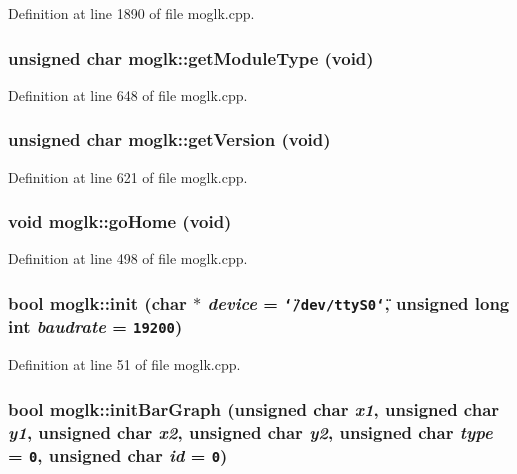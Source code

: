 Definition at line 1890 of file moglk.cpp.\hypertarget{classmoglk_9fffd2e63880a4ea0ecf8e1d9f196668}{
\subsubsection[{getModuleType}]{\setlength{\rightskip}{0pt plus 5cm}unsigned char moglk::getModuleType (void)}}
\label{classmoglk_9fffd2e63880a4ea0ecf8e1d9f196668}




Definition at line 648 of file moglk.cpp.\hypertarget{classmoglk_353d736b01087f171ceb14a7a01cd292}{
\subsubsection[{getVersion}]{\setlength{\rightskip}{0pt plus 5cm}unsigned char moglk::getVersion (void)}}
\label{classmoglk_353d736b01087f171ceb14a7a01cd292}




Definition at line 621 of file moglk.cpp.\hypertarget{classmoglk_1f33a99d62509dfd98ca6898ba5a228e}{
\subsubsection[{goHome}]{\setlength{\rightskip}{0pt plus 5cm}void moglk::goHome (void)}}
\label{classmoglk_1f33a99d62509dfd98ca6898ba5a228e}




Definition at line 498 of file moglk.cpp.\hypertarget{classmoglk_2b26bc8f68f3b4efcac9d1e6d902b695}{
\subsubsection[{init}]{\setlength{\rightskip}{0pt plus 5cm}bool moglk::init (char $\ast$ {\em device} = {\tt \char`\"{}/dev/ttyS0\char`\"{}}, \/  unsigned long int {\em baudrate} = {\tt 19200})}}
\label{classmoglk_2b26bc8f68f3b4efcac9d1e6d902b695}




Definition at line 51 of file moglk.cpp.\hypertarget{classmoglk_cf20f143dc45f7cffd9cde3de54ea8aa}{
\subsubsection[{initBarGraph}]{\setlength{\rightskip}{0pt plus 5cm}bool moglk::initBarGraph (unsigned char {\em x1}, \/  unsigned char {\em y1}, \/  unsigned char {\em x2}, \/  unsigned char {\em y2}, \/  unsigned char {\em type} = {\tt 0}, \/  unsigned char {\em id} = {\tt 0})}}
\label{classmoglk_cf20f143dc45f7cffd9cde3de54ea8aa}




